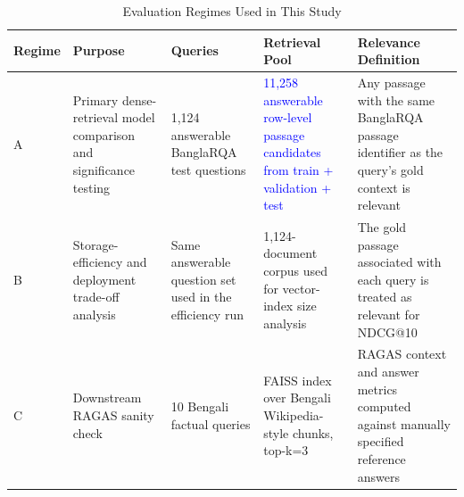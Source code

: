 \documentclass[manuscript,screen,review]{acmart}
\newcommand{\revise}[1]{\textcolor{blue}{#1}}
\begin{document}
\begin{table}[t]
    \centering
    \caption{Evaluation Regimes Used in This Study}
    \label{tab:evaluation_regimes}
    \small
    \begin{tabularx}{\textwidth}{L{1.7cm}L{2.6cm}L{2.2cm}L{2.4cm}Y}
        \toprule
        \textbf{Regime} & \textbf{Purpose} & \textbf{Queries} & \textbf{Retrieval Pool} & \textbf{Relevance Definition} \\
        \midrule
        A & Primary dense-retrieval model comparison and significance testing & 1,124 answerable BanglaRQA test questions & \revise{11,258 answerable row-level passage candidates from train + validation + test} & Any passage with the same BanglaRQA passage identifier as the query's gold context is relevant \\
        B & Storage-efficiency and deployment trade-off analysis & Same answerable question set used in the efficiency run & 1,124-document corpus used for vector-index size analysis & The gold passage associated with each query is treated as relevant for NDCG@10 \\
        C & Downstream RAGAS sanity check & 10 Bengali factual queries & FAISS index over Bengali Wikipedia-style chunks, top-k=3 & RAGAS context and answer metrics computed against manually specified reference answers \\
        \bottomrule
    \end{tabularx}
\end{table}
\end{document}
